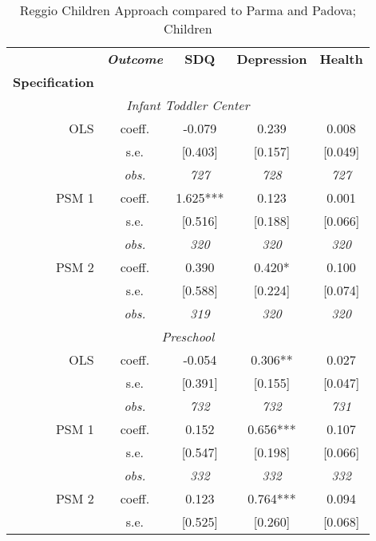 \begin{table}[H]		
\caption{Reggio Children Approach compared to Parma and Padova; Children}					
\label{tab:resultsChild-parmapadova}					
 \begin{centering}		
\vspace{1ex}					
\begin{tabular}{ r c ccc}		
\hline \hline		
 & \textbf{\textit{Outcome}} & \textbf{SDQ}  & \textbf{Depression} & \textbf{Health}  \\		
\textbf{Specification}  &  &  &  &  \\		
\hline		
\multicolumn{5}{c}{\textit{Infant Toddler Center }} \\		
\hline		
					
OLS	 & coeff.	 & -0.079	 & 0.239	 & 0.008	\\
	 & s.e.	 & [0.403]	 & [0.157]	 & [0.049]	\\
	 & \textit{obs.}	 & \textit{727}	 & \textit{728}	 & \textit{727}	\\
PSM 1	 & coeff.	 & 1.625***	 & 0.123	 & 0.001	\\
	 & s.e.	 & [0.516]	 & [0.188]	 & [0.066]	\\
	 & \textit{obs.}	 & \textit{320}	 & \textit{320}	 & \textit{320}	\\
PSM 2	 & coeff.	 & 0.390	 & 0.420*	 & 0.100	\\
	 & s.e.	 & [0.588]	 & [0.224]	 & [0.074]	\\
	 & \textit{obs.}	 & \textit{319}	 & \textit{320}	 & \textit{320}	\\
\hline \multicolumn{5}{c}{\textit{Preschool }} \\ \hline					
OLS	 & coeff.	 & -0.054	 & 0.306**	 & 0.027	\\
	 & s.e.	 & [0.391]	 & [0.155]	 & [0.047]	\\
	 & \textit{obs.}	 & \textit{732}	 & \textit{732}	 & \textit{731}	\\
PSM 1	 & coeff.	 & 0.152	 & 0.656***	 & 0.107	\\
	 & s.e.	 & [0.547]	 & [0.198]	 & [0.066]	\\
	 & \textit{obs.}	 & \textit{332}	 & \textit{332}	 & \textit{332}	\\
PSM 2	 & coeff.	 & 0.123	 & 0.764***	 & 0.094	\\
	 & s.e.	 & [0.525]	 & [0.260]	 & [0.068]	\\

\end{tabular}
\end{centering}
\end{table}
